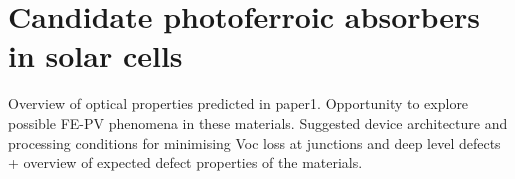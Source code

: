 \documentclass[11pt, twoside]{report}
\begin{document}
\section{Candidate photoferroic absorbers in solar cells}
Overview of optical properties predicted in paper1. Opportunity to explore possible FE-PV phenomena in these materials. Suggested device architecture and processing conditions for minimising Voc loss at junctions and deep level defects + overview of expected defect properties of the materials.

\appendix

\end{document}
